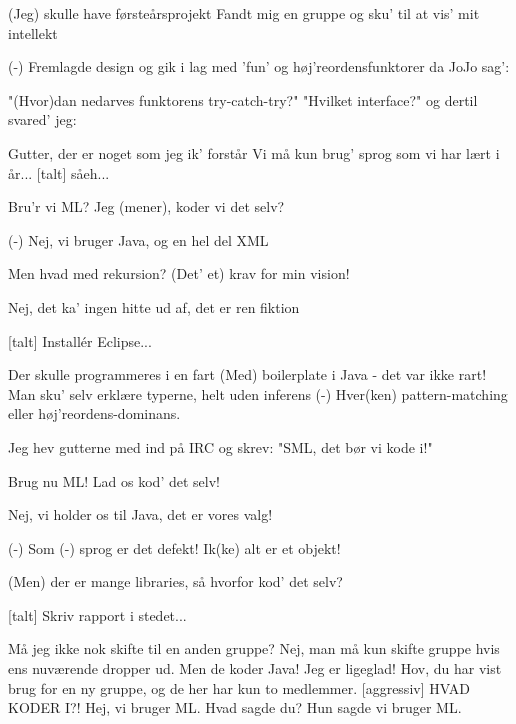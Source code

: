 \documentclass[a4paper,11pt]{article}
\begin{document}
\begin{song}
  (Jeg) skulle have førsteårsprojekt
  Fandt mig en gruppe og sku' til at vis' mit intellekt

  (-) Fremlagde design og gik i lag
  med 'fun' og høj'reordensfunktorer da JoJo sag':

  "(Hvor)dan nedarves funktorens try-catch-try?"
  "Hvilket interface?"
  og dertil svared' jeg:

  Gutter, der er noget som jeg ik' forstår
  Vi må kun brug' sprog som vi har lært i år... [talt] såeh...

  Bru'r vi ML?
  Jeg (mener), koder vi det selv?

  (-) Nej, vi bruger Java, og en hel del XML

  Men hvad med rekursion?
  (Det' et) krav for min vision!

  Nej, det ka' ingen hitte ud af, det er ren fiktion

  [talt] Installér Eclipse...

  Der skulle programmeres i en fart
  (Med) boilerplate i Java - det var ikke rart!
  Man sku' selv erklære typerne, helt uden inferens
  (-) Hver(ken) pattern-matching eller høj'reordens-dominans.

  Jeg hev gutterne med ind på IRC
  og skrev: "SML, det bør vi kode i!"

  Brug nu ML!
  Lad os kod' det selv!

  Nej, vi holder os til Java, det er vores valg!

  (-) Som (-) sprog er det defekt!
  Ik(ke) alt er et objekt!

  (Men) der er mange libraries, så hvorfor kod' det selv?

  [talt] Skriv rapport i stedet...



   Må jeg ikke nok skifte til en anden gruppe?
   Nej, man må kun skifte gruppe hvis ens nuværende dropper ud.
   Men de koder Java!
   Jeg er ligeglad!
   Hov, du har vist brug for en ny gruppe, og de her har kun to medlemmer.
  [aggressiv] HVAD KODER I?!
   Hej, vi bruger ML.
   Hvad sagde du?
   Hun sagde vi bruger ML.


\end{song}
\end{document}
